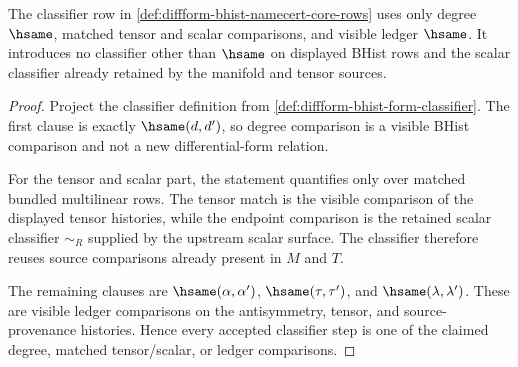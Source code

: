 \begin{theorem}
\label{thm:diffform-bhist-classifier-obligation}
The classifier row in
\autoref{def:diffform-bhist-namecert-core-rows} uses only degree
$\hsame$, matched tensor and scalar comparisons, and visible ledger
$\hsame$. It introduces no classifier other than $\hsame$ on displayed BHist
rows and the scalar classifier already retained by the manifold and tensor
sources.
\end{theorem}
\begin{proof}
Project the classifier definition from
\autoref{def:diffform-bhist-form-classifier}. The first clause is exactly
$\hsame(d,d')$, so degree comparison is a visible BHist comparison and not a
new differential-form relation.

For the tensor and scalar part, the statement quantifies only over matched
bundled multilinear rows. The tensor match is the visible comparison of the
displayed tensor histories, while the endpoint comparison is the retained
scalar classifier $\sim_R$ supplied by the upstream scalar surface. The
classifier therefore reuses source comparisons already present in $M$ and
$T$.

The remaining clauses are
$\hsame(\alpha,\alpha')$, $\hsame(\tau,\tau')$, and
$\hsame(\lambda,\lambda')$. These are visible ledger comparisons on the
antisymmetry, tensor, and source-provenance histories. Hence every accepted
classifier step is one of the claimed degree, matched tensor/scalar, or
ledger comparisons.
\end{proof}

